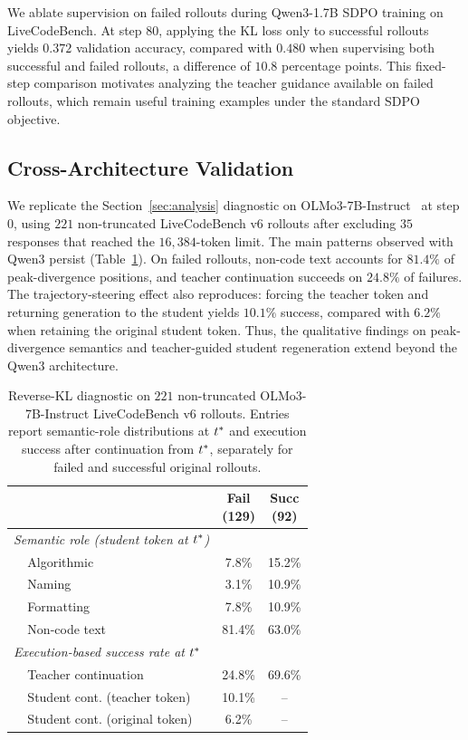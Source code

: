 We ablate supervision on failed rollouts during Qwen3-1.7B SDPO training on LiveCodeBench. At step $80$, applying the KL loss only to successful rollouts yields $0.372$ validation accuracy, compared with $0.480$ when supervising both successful and failed rollouts, a difference of $10.8$ percentage points. This fixed-step comparison motivates analyzing the teacher guidance available on failed rollouts, which remain useful training examples under the standard SDPO objective.


\subsection{Cross-Architecture Validation}
\label{app:crossarch}

We replicate the Section~\ref{sec:analysis} diagnostic on OLMo3-7B-Instruct~\citep{olmo2025olmo3} at step $0$, using $221$ non-truncated LiveCodeBench v6 rollouts after excluding $35$ responses that reached the $16{,}384$-token limit. The main patterns observed with Qwen3 persist (Table~\ref{tab:olmo3}). On failed rollouts, non-code text accounts for $81.4\%$ of peak-divergence positions, and teacher continuation succeeds on $24.8\%$ of failures. The trajectory-steering effect also reproduces: forcing the teacher token and returning generation to the student yields $10.1\%$ success, compared with $6.2\%$ when retaining the original student token. Thus, the qualitative findings on peak-divergence semantics and teacher-guided student regeneration extend beyond the Qwen3 architecture.

\begin{table}[ht]
\caption{Reverse-KL diagnostic on $221$ non-truncated OLMo3-7B-Instruct LiveCodeBench v6 rollouts. Entries report semantic-role distributions at $t^{*}$ and execution success after continuation from $t^{*}$, separately for failed and successful original rollouts.}  \label{tab:olmo3}
  \centering
  \small
  \begin{tabular*}{0.6\linewidth}{@{\extracolsep{\fill}}llcc@{\hspace{3pt}}}
    \toprule
    & & \makecell{Fail\\(129)} & \makecell{Succ\\(92)} \\
    \midrule
    \multicolumn{2}{l}{\textit{Semantic role (student token at $t^{*}$)}} \\
    & Algorithmic   &  7.8\% & 15.2\% \\
    & Naming        &  3.1\% & 10.9\% \\
    & Formatting    &  7.8\% & 10.9\% \\
    & Non-code text & 81.4\% & 63.0\% \\
    \midrule
    \multicolumn{2}{l}{\textit{Execution-based success rate at $t^{*}$}} \\
    & Teacher continuation & 24.8\% & 69.6\% \\
    & Student cont. (teacher token) & 10.1\% & -- \\
    & Student cont. (original token) & 6.2\% & -- \\
    \bottomrule
  \end{tabular*}
\end{table}

